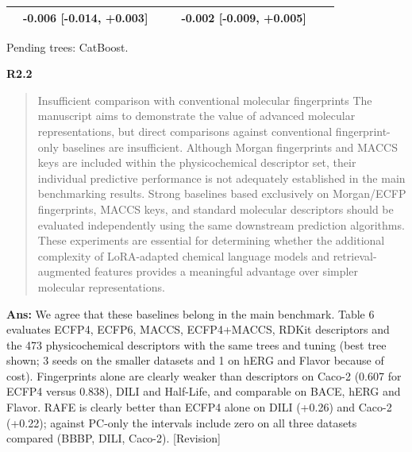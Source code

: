\documentclass[
  10pt,
]{article}
\begin{document}
\begin{longtable}[]{@{}lllllll@{}}
\begin{minipage}[t]{0.12\columnwidth}
\end{minipage} & \begin{minipage}[t]{0.12\columnwidth}\raggedright
-0.006 {[}-0.014, +0.003{]}\strut
\end{minipage} & \begin{minipage}[t]{0.12\columnwidth}\raggedright
\strut
\end{minipage} & \begin{minipage}[t]{0.12\columnwidth}\raggedright
\strut
\end{minipage} & \begin{minipage}[t]{0.12\columnwidth}\raggedright
-0.002 {[}-0.009, +0.005{]}\strut
\end{minipage} & \begin{minipage}[t]{0.12\columnwidth}\raggedright
\strut
\end{minipage} & \begin{minipage}[t]{0.12\columnwidth}\raggedright
\strut
\end{minipage}\tabularnewline
\bottomrule
\end{longtable}

Pending trees: CatBoost.

\textbf{R2.2}

\begin{quote}
Insufficient comparison with conventional molecular fingerprints The
manuscript aims to demonstrate the value of advanced molecular
representations, but direct comparisons against conventional
fingerprint-only baselines are insufficient. Although Morgan
fingerprints and MACCS keys are included within the physicochemical
descriptor set, their individual predictive performance is not
adequately established in the main benchmarking results. Strong
baselines based exclusively on Morgan/ECFP fingerprints, MACCS keys, and
standard molecular descriptors should be evaluated independently using
the same downstream prediction algorithms. These experiments are
essential for determining whether the additional complexity of
LoRA-adapted chemical language models and retrieval-augmented features
provides a meaningful advantage over simpler molecular representations.
\end{quote}

\textbf{Ans:} We agree that these baselines belong in the main
benchmark. Table 6 evaluates ECFP4, ECFP6, MACCS, ECFP4+MACCS, RDKit
descriptors and the 473 physicochemical descriptors with the same trees
and tuning (best tree shown; 3 seeds on the smaller datasets and 1 on
hERG and Flavor because of cost). Fingerprints alone are clearly weaker
than descriptors on Caco-2 (0.607 for ECFP4 versus 0.838), DILI and
Half-Life, and comparable on BACE, hERG and Flavor. RAFE is clearly
better than ECFP4 alone on DILI (+0.26) and Caco-2 (+0.22); against
PC-only the intervals include zero on all three datasets compared (BBBP,
DILI, Caco-2). {[}Revision{]}
\end{document}
